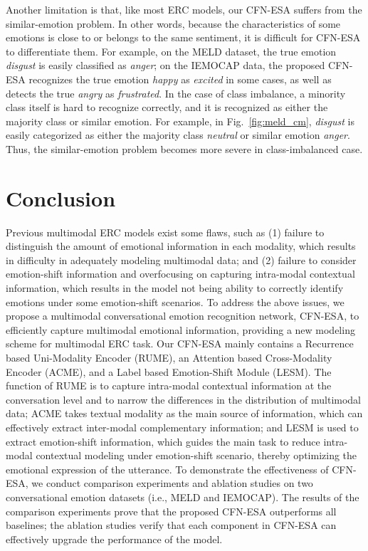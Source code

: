 \documentclass[journal]{IEEEtran}
\begin{document}
Another limitation is that, like most ERC models, our CFN-ESA suffers from the similar-emotion problem. In other words, because the characteristics of some emotions is close to or belongs to the same sentiment, it is difficult for CFN-ESA to differentiate them. For example, on the MELD dataset, the true emotion \textit{disgust} is easily classified as \textit{anger}; on the IEMOCAP data, the proposed CFN-ESA recognizes the true emotion \textit{happy} as \textit{excited} in some cases, as well as detects the true \textit{angry} as \textit{frustrated}. In the case of class imbalance, a minority class itself is hard to recognize correctly, and it is recognized as either the majority class or similar emotion. For example, in Fig.~\ref{fig:meld_cm}, \textit{disgust} is easily categorized as either the majority class \textit{neutral} or similar emotion \textit{anger}. Thus, the similar-emotion problem becomes more severe in class-imbalanced case.

\section{Conclusion}\label{conclusion}
Previous multimodal ERC models exist some flaws, such as (1) failure to distinguish the amount of emotional information in each modality, which results in difficulty in adequately modeling multimodal data; and (2) failure to consider emotion-shift information and overfocusing on capturing intra-modal contextual information, which results in the model not being ability to correctly identify emotions under some emotion-shift scenarios. To address the above issues, we propose a multimodal conversational emotion recognition network, CFN-ESA, to efficiently capture multimodal emotional information, providing a new modeling scheme for multimodal ERC task. Our CFN-ESA mainly contains a Recurrence based Uni-Modality Encoder (RUME), an Attention based Cross-Modality Encoder (ACME), and a Label based Emotion-Shift Module (LESM). The function of RUME is to capture intra-modal contextual information at the conversation level and to narrow the differences in the distribution of multimodal data; ACME takes textual modality as the main source of information, which can effectively extract inter-modal complementary information; and LESM is used to extract emotion-shift information, which guides the main task to reduce intra-modal contextual modeling under emotion-shift scenario, thereby optimizing the emotional expression of the utterance. To demonstrate the effectiveness of CFN-ESA, we conduct comparison experiments and ablation studies on two conversational emotion datasets (i.e., MELD and IEMOCAP). The results of the comparison experiments prove that the proposed CFN-ESA outperforms all baselines; the ablation studies verify that each component in CFN-ESA can effectively upgrade the performance of the model.
\end{document}
